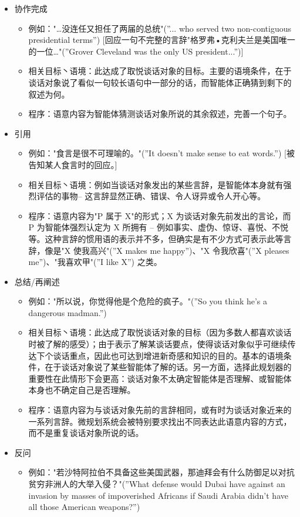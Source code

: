 \begin{itemize}
\item 协作完成
\begin{itemize}
\item 例如："…没连任又担任了两届的总统"(”... who served two non-contiguous presidential terms”) [回应一句不完整的言辞"格罗弗•克利夫兰是美国唯一的一位…"(”Grover Cleveland was the only US president...”)] 
\item 相关目标丶语境：此达成了取悦谈话对象的目标。主要的语境条件，在于谈话对象说了看似一句较长语句中一部分的话，而智能体正确猜到剩下的叙述为何。
\item 程序：语意内容为智能体猜测谈话对象所说的其余叙述，完善一个句子。
\end{itemize}
\item 引用
\begin{itemize}
\item 例如："食言是很不可理喻的。"(”It doesn’t make sense to eat words.”) [被告知某人食言时的回应。] 
\item 相关目标丶语境：例如当谈话对象发出的某些言辞，是智能体本身就有强烈评估的事物– 这言辞显然正确、错误、令人讶异或令人开心等。 
\item 程序：语意内容为"P 属于 X"的形式；X 为谈话对象先前发出的言论，而 P 为智能体强烈认定为 X 所拥有 – 例如事实、虚伪、惊讶、喜悦、不悦等。这种言辞的惯用语的表示并不多，但确实是有不少方式可表示此等言辞，像是"X 使我高兴"(”X makes me happy”)、"X 令我欣喜"(”X pleases me”)、"我喜欢甲"(”I like X”) 之类。
\end{itemize}
\item 总结/再阐述
\begin{itemize}
\item 例如："所以说，你觉得他是个危险的疯子。"(”So you think he’s a dangerous madman.”)
\item 相关目标丶语境：此达成了取悦谈话对象的目标（因为多数人都喜欢谈话时被了解的感受）；由于表示了解某谈话要点，使得谈话对象似乎可继续传达下个谈话重点，因此也可达到增进新奇感和知识的目的。基本的语境条件，在于谈话对象说了某些智能体了解的话。另一方面，选择此规划器的重要性在此情形下会更高：谈话对象不太确定智能体是否理解、或智能体本身也不确定自己是否理解。 
\item 程序：语意内容为与谈话对象先前的言辞相同，或有时为谈话对象近来的一系列言辞。微规划系统会被特别要求找出不同表达此语意内容的方式，而不是重复谈话对象所说的话。
\end{itemize}
\item 反问
\begin{itemize}
\item 例如："若沙特阿拉伯不具备这些美国武器，那迪拜会有什么防御足以对抗贫穷非洲人的大举入侵？"(”What defense would Dubai have against an invasion by masses of impoverished Africans if Saudi Arabia didn’t have all those American weapons?”)

\end{itemize}
\end{itemize}
